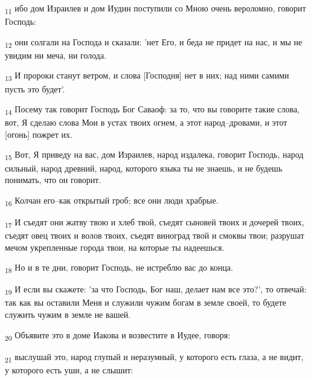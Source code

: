 \begin{tcolorbox}
\textsubscript{11} ибо дом Израилев и дом Иудин поступили со Мною очень вероломно, говорит Господь:
\end{tcolorbox}
\begin{tcolorbox}
\textsubscript{12} они солгали на Господа и сказали: 'нет Его, и беда не придет на нас, и мы не увидим ни меча, ни голода.
\end{tcolorbox}
\begin{tcolorbox}
\textsubscript{13} И пророки станут ветром, и слова [Господня] нет в них; над ними самими пусть это будет'.
\end{tcolorbox}
\begin{tcolorbox}
\textsubscript{14} Посему так говорит Господь Бог Саваоф: за то, что вы говорите такие слова, вот, Я сделаю слова Мои в устах твоих огнем, а этот народ--дровами, и этот [огонь] пожрет их.
\end{tcolorbox}
\begin{tcolorbox}
\textsubscript{15} Вот, Я приведу на вас, дом Израилев, народ издалека, говорит Господь, народ сильный, народ древний, народ, которого языка ты не знаешь, и не будешь понимать, что он говорит.
\end{tcolorbox}
\begin{tcolorbox}
\textsubscript{16} Колчан его--как открытый гроб; все они люди храбрые.
\end{tcolorbox}
\begin{tcolorbox}
\textsubscript{17} И съедят они жатву твою и хлеб твой, съедят сыновей твоих и дочерей твоих, съедят овец твоих и волов твоих, съедят виноград твой и смоквы твои; разрушат мечом укрепленные города твои, на которые ты надеешься.
\end{tcolorbox}
\begin{tcolorbox}
\textsubscript{18} Но и в те дни, говорит Господь, не истреблю вас до конца.
\end{tcolorbox}
\begin{tcolorbox}
\textsubscript{19} И если вы скажете: 'за что Господь, Бог наш, делает нам все это?', то отвечай: так как вы оставили Меня и служили чужим богам в земле своей, то будете служить чужим в земле не вашей.
\end{tcolorbox}
\begin{tcolorbox}
\textsubscript{20} Объявите это в доме Иакова и возвестите в Иудее, говоря:
\end{tcolorbox}
\begin{tcolorbox}
\textsubscript{21} выслушай это, народ глупый и неразумный, у которого есть глаза, а не видит, у которого есть уши, а не слышит:
\end{tcolorbox}
